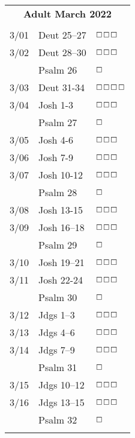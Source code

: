 \documentclass[10pt,landscape,letterpaper]{article}
\begin{document}
\begin{multicols}{5}
\begin{tabular}{p{0.15in}p{0.7in}p{0.5in}}
\multicolumn{3}{c}{\textbf{Adult March 2022}} \\
& & \\
3/01 & Deut 25--27 & $\boxempty$$\boxempty$$\boxempty$ \\
3/02 & Deut 28--30 & $\boxempty$$\boxempty$$\boxempty$ \\
 & \textcolor[rgb]{0.98,0.00,0.00}{Psalm 26} & \textcolor[rgb]{1.00,0.00,0.00}{$\boxempty$} \\
3/03 & Deut 31-34 & $\boxempty$$\boxempty$$\boxempty$$\boxempty$ \\
3/04 & Josh 1-3 & $\boxempty$$\boxempty$$\boxempty$ \\
 & \textcolor[rgb]{0.98,0.00,0.00}{Psalm 27} & \textcolor[rgb]{1.00,0.00,0.00}{$\boxempty$} \\
3/05 & Josh 4-6 & $\boxempty$$\boxempty$$\boxempty$ \\
3/06 & Josh 7-9 & $\boxempty$$\boxempty$$\boxempty$ \\
3/07 & Josh 10-12 & $\boxempty$$\boxempty$$\boxempty$ \\
 & \textcolor[rgb]{0.98,0.00,0.00}{Psalm 28} & \textcolor[rgb]{1.00,0.00,0.00}{$\boxempty$} \\
3/08 & Josh 13-15 & $\boxempty$$\boxempty$$\boxempty$ \\
3/09 & Josh 16--18 & $\boxempty$$\boxempty$$\boxempty$ \\
 & \textcolor[rgb]{0.98,0.00,0.00}{Psalm 29} & \textcolor[rgb]{1.00,0.00,0.00}{$\boxempty$} \\
3/10 & Josh 19--21 & $\boxempty$$\boxempty$$\boxempty$ \\
3/11 & Josh 22-24 & $\boxempty$$\boxempty$$\boxempty$ \\
 & \textcolor[rgb]{0.98,0.00,0.00}{Psalm 30} & \textcolor[rgb]{1.00,0.00,0.00}{$\boxempty$} \\
3/12 & Jdgs 1--3 & $\boxempty$$\boxempty$$\boxempty$ \\
3/13 & Jdgs 4--6 & $\boxempty$$\boxempty$$\boxempty$ \\
3/14 & Jdgs 7--9 & $\boxempty$$\boxempty$$\boxempty$ \\
 & \textcolor[rgb]{0.98,0.00,0.00}{Psalm 31} & \textcolor[rgb]{1.00,0.00,0.00}{$\boxempty$} \\
3/15 & Jdgs 10--12 & $\boxempty$$\boxempty$$\boxempty$ \\
3/16 & Jdgs 13--15 & $\boxempty$$\boxempty$$\boxempty$ \\
 & \textcolor[rgb]{0.98,0.00,0.00}{Psalm 32} & \textcolor[rgb]{1.00,0.00,0.00}{$\boxempty$} \\
$$
\end{tabular}
\end{multicols}
\end{document}
